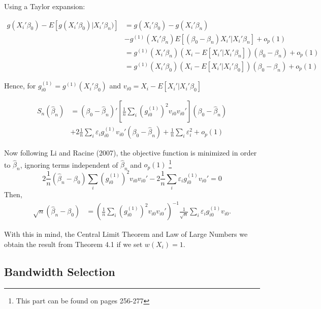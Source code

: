 \documentclass[a4paper]{article}
\begin{document}
Using a Taylor expansion:

\begin{align*}
g(X_i'\beta_0) - E[g(X_i'\beta_0)|X_i'\beta_n)] & = g(X_i'\beta_0) - g(X_i'\beta_n) \\
											 & - g^{(1)}(X_i'\beta_n)E[(\beta_0 - \beta_n)X_i'|X_i'\beta_n] + o_p(1) \\
				                              & = g^{(1)}(X_i'\beta_n)( X_i - E[X_i'|X_i'\beta_n])(\beta_0 - \beta_n) + o_p(1) \\
				                              & = g^{(1)}(X_i'\beta_0)( X_i - E[X_i'|X_i'\beta_0])(\beta_0 - \beta_n) + o_p(1)
\end{align*}


Hence, for $g_{i0}^{(1)} = g^{(1)}(X_i'\beta_0)$ and $v_{i0} = X_i - E[X_i'|X_i'\beta_0]$
 
\begin{align*}
S_{n}(\hat{\beta}_n) & = (\beta_0 - \hat{\beta}_n)'\left[\frac{1}{n}\sum_i (g_{i0}^{(1)})^2v_{i0}v_{i0}'\right](\beta_0 - \hat{\beta}_n) \\
             & + 2\frac{1}{n}\sum_i\varepsilon_ig_{i0}^{(1)}v_{i0}'(\beta_0 - \hat{\beta}_n) + \frac{1}{n}\sum_i \varepsilon_i^2 + o_p(1)
\end{align*}

Now following Li and Racine (2007), the objective function is minimized in order to $\hat{\beta}_n$, ignoring terms independent of $\hat{\beta}_n$ and $o_p(1)$ \footnote{This part can be found on pages 256-277}
\[2\frac{1}{n}(\hat{\beta}_n - \beta_0)\sum_i(g_{i0}^{(1)})^2v_{i0}v_{i0}' - 2\frac{1}{n}\sum_i\varepsilon_ig_{i0}^{(1)}v_{i0}' = 0 \]
Then, 
\begin{align*}
\sqrt{n}(\hat{\beta}_n - \beta_0) & = (\frac{1}{n}\sum_i(g_{i0}^{(1)})^2v_{i0}v_{i0}')^{-1}\frac{1}{\sqrt{n}}\sum_i\varepsilon_i g_{i0}^{(1)}v_{i0}.
\end{align*}

With this in mind, the Central Limit Theorem and Law of Large Numbers we obtain the result from Theorem 4.1 if we set $w(X_i) = 1$.




\subsection{Bandwidth Selection} %
\label{sub:Bandwidth Selection}
\end{document}
